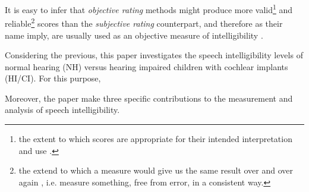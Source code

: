 It is easy to infer that \textit{objective rating} methods might produce more valid\footnote{the extent to which scores are appropriate for their intended interpretation and use \citep{Lesterhuis_2018, Trochim_2022}.} and reliable\footnote{the extend to which a measure would give us the same result over and over again \citep{Trochim_2022}, i.e. measure something, free from error, in a consistent way.} scores than the \textit{subjective rating} counterpart, and therefore as their name imply, are usually used as an objective measure of intelligibility \citep{Boonen_et_al_2021, Faes_et_al_2021}.

Considering the previous, this paper investigates the speech intelligibility levels of normal hearing (NH) versus hearing impaired children with cochlear implants (HI/CI). For this purpose,  

\begin{comment}
add previous evidence about this comparison
\end{comment}

Moreover, the paper make three specific contributions to the measurement and analysis of speech intelligibility. 

\begin{comment}
First, we develop a novel analysis of speech intelligibility using a latent variable approach. More specifically, we model SI as a latent variable inferred from entropy measures coming from the transcription task. This method has XX specific benefits. First, it allows to construct a speech intelligibility score at the children level, which in turn allow us to make comparisons at the individual level. Second, it allow us to control for different types of sources of variation: individual variation (some hypothesis say there is a lot variation in this level), block effects (coming from the experimental design), and measurement error (resulting from the nested structure of measurement), which later allow us to test hypothesis at appropriate levels. Finally, it also measures the reliability (variability) of the transcription task.

Second, we describe in detail the sources of variation in speech intelligibility based on a set of covariates of interest. We supplement our description of the sources of variation with a causal analysis of the factors influencing this variation mention evidence on hearing age, etiology and pta. It is important to understand that a cochlear implant partially restores a severe-to-profound sensorineural hearing loss, i.e. the signal provided by the apparatus is still degraded compared to the signal in normal hearing (Drennan, \& Rubinstein, 2008). However, even under this condition, the device enables children with severe-to-profound hearing impairment to perceive speech and other environmental sounds.

Finally, we wrap the full analysis procedure under the bayesian framework, providing the steps, assumptions and computational implementation of the method.
\end{comment}
